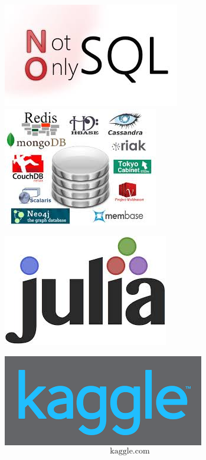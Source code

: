 \documentclass[PredictiveAnalytics101.tex]{subfiles}
\begin{document}
\begin{frame}
\vspace{-0.3cm}
\begin{figure}
\centering
\includegraphics[width=0.4\linewidth]{images/nosql}\\
\includegraphics[width=0.7\linewidth]{images/nosql2}
\end{figure}
\end{frame}
\begin{frame}
\begin{figure}
\centering
\includegraphics[width=0.7\linewidth]{images/julialogo}
\end{figure}
\end{frame}
\begin{frame}
	\begin{figure}
\centering
\includegraphics[width=0.7\linewidth]{images/kagge}
\huge \[ \mbox{kaggle.com} \]
\end{figure}
\end{frame}
\end{document}
